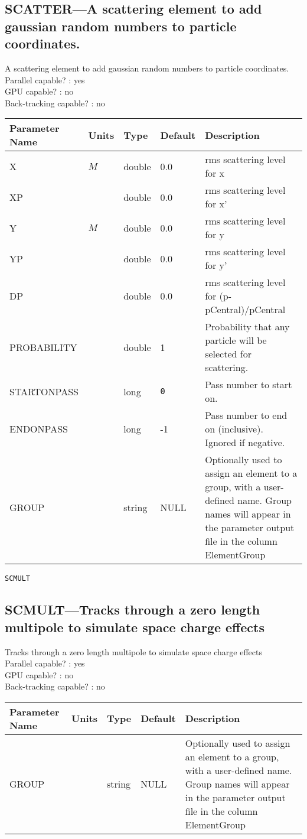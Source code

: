 \subsection{SCATTER---A scattering element to add gaussian random numbers to particle coordinates.}
A scattering element to add gaussian random numbers to particle coordinates.
\\
Parallel capable? : yes\\
GPU capable? : no\\
Back-tracking capable? : no\\
\begin{tabular}{|l|l|l|l|p{\descwidth}|} \hline
Parameter Name & Units & Type & Default & Description \\ \hline 
X & $M$ & double &  0.0 & rms scattering level for x  \\ \hline 
XP &  & double &  0.0 & rms scattering level for x'  \\ \hline 
Y & $M$ & double &  0.0 & rms scattering level for y  \\ \hline 
YP &  & double &  0.0 & rms scattering level for y'  \\ \hline 
DP &  & double &  0.0 & rms scattering level for (p-pCentral)/pCentral  \\ \hline 
PROBABILITY &  & double &   1 & Probability that any particle will be selected for scattering.  \\ \hline 
STARTONPASS &  & long &  \verb|0| & Pass number to start on.  \\ \hline 
ENDONPASS &  & long &   -1              & Pass number to end on (inclusive).  Ignored if negative.  \\ \hline 
GROUP &  & string & NULL & Optionally used to assign an element to a group, with a user-defined name.  Group names will appear in the parameter output file in the column ElementGroup  \\ \hline 
\end{tabular}

\newpage
\begin{center}{\Large\verb|SCMULT|}\end{center}
\subsection{SCMULT---Tracks through a zero length multipole to simulate space charge effects}
Tracks through a zero length multipole to simulate space charge effects
\\
Parallel capable? : yes\\
GPU capable? : no\\
Back-tracking capable? : no\\
\begin{tabular}{|l|l|l|l|p{\descwidth}|} \hline
Parameter Name & Units & Type & Default & Description \\ \hline 
GROUP &  & string & NULL & Optionally used to assign an element to a group, with a user-defined name.  Group names will appear in the parameter output file in the column ElementGroup  \\ \hline 
\end{tabular}

